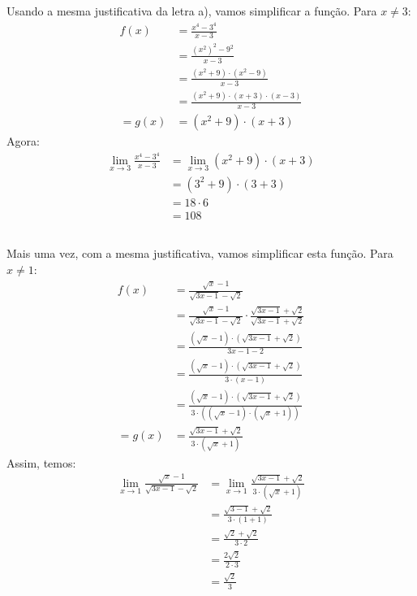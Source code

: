 \documentclass[12pt]{article}
\begin{document}
\subsection{}
Usando a mesma justificativa da letra a), vamos simplificar a função. Para \(x \ne 3\):
\begin{align*}
	f(x)
	&= \frac{x^4-3^4}{x-3} \\
	&= \frac{{(x^2)}^2-9^2}{x-3} \\
	&= \frac{(x^2+9)\cdot(x^2-9)}{x-3} \\
	&= \frac{(x^2+9)\cdot(x+3)\cdot(x-3)}{x-3} \\
	= g(x)
	&= (x^2+9)\cdot(x+3)
\end{align*}
Agora:
\begin{align*}
	\lim_{x\rightarrow 3} \frac{x^4-3^4}{x-3}
	&= \lim_{x\rightarrow 3} (x^2+9)\cdot(x+3) \\
	&= (3^2+9)\cdot(3+3) \\
	&= 18\cdot6 \\
	&= 108
\end{align*}
\subsection{}
Mais uma vez, com a mesma justificativa, vamos simplificar esta função. Para \(x \ne 1\):
\begin{align*}
	f(x)
	&= \frac{\sqrt{x}-1}{\sqrt{3x-1}-\sqrt{2}} \\
	&= \frac{\sqrt{x}-1}{\sqrt{3x-1}-\sqrt{2}} \cdot \frac{\sqrt{3x-1}+\sqrt{2}}{\sqrt{3x-1}+\sqrt{2}} \\
	&= \frac{(\sqrt{x}-1)\cdot(\sqrt{3x-1}+\sqrt{2})}{3x-1-2} \\
	&= \frac{(\sqrt{x}-1)\cdot(\sqrt{3x-1}+\sqrt{2})}{3\cdot(x-1)} \\
	&= \frac{(\sqrt{x}-1)\cdot(\sqrt{3x-1}+\sqrt{2})}{3\cdot((\sqrt{x}-1)\cdot(\sqrt{x}+1))} \\
	= g(x)
	&= \frac{\sqrt{3x-1}+\sqrt{2}}{3\cdot(\sqrt{x}+1)}
\end{align*}
Assim, temos:
\begin{align*}
	\lim_{x\rightarrow 1} \frac{\sqrt{x}-1}{\sqrt{3x-1}-\sqrt{2}}
	&= \lim_{x\rightarrow 1} \frac{\sqrt{3x-1}+\sqrt{2}}{3\cdot(\sqrt{x}+1)} \\
	&= \frac{\sqrt{3-1}+\sqrt{2}}{3\cdot(1+1)} \\
	&= \frac{\sqrt{2}+\sqrt{2}}{3\cdot2} \\
	&= \frac{2\sqrt{2}}{2\cdot3} \\
	&= \frac{\sqrt{2}}{3}
\end{align*}
\end{document}
